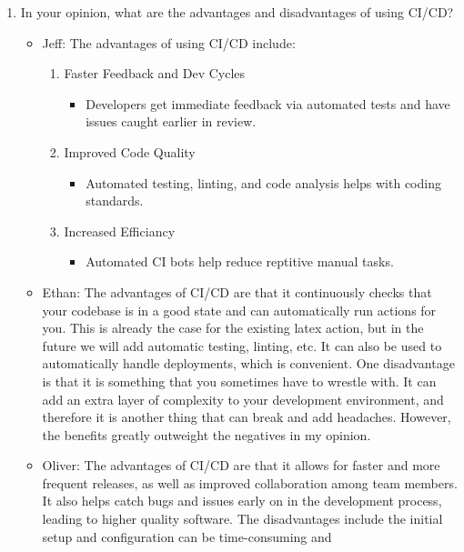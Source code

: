 \documentclass{article}
\begin{document}
\begin{enumerate}
\begin{itemize}
	\end{itemize}
    \item In your opinion, what are the advantages and disadvantages of using
    CI/CD?
	\begin{itemize}
		\item Jeff: The advantages of using CI/CD include: 
    \begin{enumerate}
      \item Faster Feedback and Dev Cycles
      \begin{itemize}
        \item Developers get immediate feedback via automated tests 
        and have issues caught earlier in review.
      \end{itemize}
      \item Improved Code Quality
      \begin{itemize}
        \item Automated testing, linting, and code analysis helps
        with coding standards.
      \end{itemize}
      \item Increased Efficiancy
      \begin{itemize}
        \item Automated CI bots help reduce reptitive manual tasks.
      \end{itemize}
    \end{enumerate}
    \item Ethan: The advantages of CI/CD are that it continuously checks that
      your codebase is in a good state and can automatically run actions for
      you. This is already the case for the existing latex action, but in the
      future we will add automatic testing, linting, etc. It can also be used
      to automatically handle deployments, which is convenient. One
      disadvantage is that it is something that you sometimes have to wrestle
      with. It can add an extra layer of complexity to your development
      environment, and therefore it is another thing that can break and add
      headaches. However, the benefits greatly outweight the negatives in my
      opinion.
		\item Oliver: The advantages of CI/CD are that it allows for 
    faster and more frequent releases, as well as improved collaboration 
    among team members. It also helps catch bugs and issues early on in the 
    development process, leading to higher quality software. The disadvantages 
    include the initial setup and configuration can be time-consuming and 

\end{itemize}
\end{enumerate}
\end{document}
